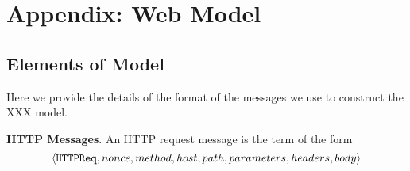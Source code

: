 \newpage
\appendix
\section{Appendix: Web Model}
\label{sec:appendix}
\subsection{Elements of Model}
Here we provide the details of the format of the messages we use to construct the XXX model.

\vspace{1mm}\noindent\textbf{HTTP Messages}.
An HTTP request message is the term of the form
\begin{equation*}
\setlength{\abovedisplayskip}{1pt}
\setlength{\belowdisplayskip}{1pt}
\langle \mathtt{HTTPReq}, nonce, method, host, path, parameters, headers, body\rangle
\end{equation*}

